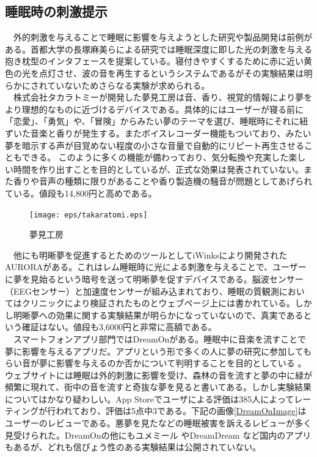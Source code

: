 \subsection{睡眠時の刺激提示}
　外的刺激を与えることで睡眠に影響を与えようとした研究や製品開発は前例がある。首都大学の長塚麻美らによる研究では睡眠深度に即した光の刺激を与える抱き枕型のインタフェースを提案している\cite{sleepSheep}。寝付きやすくするために赤に近い黄色の光を点灯させ、波の音を再生するというシステムであるがその実験結果は明らかにされていないためさらなる実験が求められる。\\
　株式会社タカラトミーが開発した夢見工房は音、香り、視覚的情報により夢をより理想的なものに近づけるデバイスである。具体的にはユーザーが寝る前に「恋愛」、「勇気」や、「冒険」からみたい夢のテーマを選び、睡眠時にそれに紐ずいた音楽と香りが発生する。またボイスレコーダー機能もついており、みたい夢を暗示する声が目覚めない程度の小さな音量で自動的にリピート再生させることもできる。 \cite{takaratomi}このように多くの機能が備わっており、気分転換や充実した楽しい時間を作り出すことを目的としているが、正式な効果は発表されていない。また香りや音声の種類に限りがあることや香り製造機の騒音が問題としてあげられている。値段も14,800円と高めである。
\begin{figure}[htbp]
\begin{center}
\texttt{[image: eps/takaratomi.eps]}
\caption{夢見工房}
\label{takaratomi}
\end{center}
\end{figure}

　他にも明晰夢を促進するとためのツールとしてiWinksにより開発されたAURORAがある。\cite{iWinks}これはレム睡眠時に光による刺激を与えることで、ユーザーに夢を見始るという暗号を送って明晰夢を促すデバイスである。脳波センサー（EEGセンサー）と加速度センサーが組み込まれており、睡眠の質観測においてはクリニックにより検証されたものとウェブページ上には書かれている。しかし明晰夢への効果に関する実験結果が明らかになっていないので、真実であるという確証はない。値段も3,6000円と非常に高額である。\\
　スマートフォンアプリ部門ではDreamOnがある。睡眠中に音楽を流すことで夢に影響を与えるアプリだ。アプリという形で多くの人に夢の研究に参加してもらい音が夢に影響を与えるのか否かについて判明することを目的としている \cite{dreamOn}。ウェブサイトには睡眠は外的刺激に影響を受け、森林の音を流すと夢の中に緑が頻繁に現れて、街中の音を流すと奇抜な夢を見ると書いてある。しかし実験結果についてはかなり疑わしい。App Storeでユーザによる評価は385人によってレーティングが行われており、評価は5点中3である。下記の画像\ref{DreamOnImage}はユーザーのレビューである。悪夢を見たなどの睡眠被害を訴えるレビューが多く見受けられた。DreamOnの他にもユメミール \cite{yumemiru}やDreamDream \cite{DreamDream}など国内のアプリもあるが、どれも信ぴょう性のある実験結果は公開されていない。

